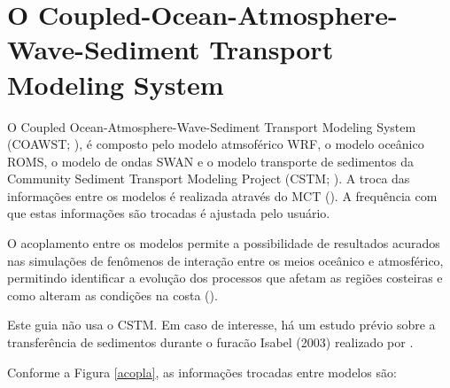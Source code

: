 \bigskip

\section{O Coupled-Ocean-Atmosphere-Wave-Sediment Transport Modeling System}
\bigskip
\noindent O Coupled Ocean-Atmosphere-Wave-Sediment Transport Modeling System (COAWST; \cite{Warner2010,Warner2008}), é composto pelo modelo atmsoférico WRF, o modelo oceânico ROMS, o modelo de ondas SWAN e o modelo transporte de sedimentos da Community Sediment Transport Modeling Project (CSTM; \cite{Warner2008}). A troca das informações entre os modelos é realizada através do MCT (\cite{Warner2010,Warner2008}). A frequência com que estas informações são trocadas é ajustada pelo usuário.
\bigskip

\noindent O acoplamento entre os modelos permite a possibilidade de resultados acurados nas simulações de fenômenos de interação entre os meios oceânico e atmosférico, permitindo identificar a evolução dos processos que afetam as regiões costeiras e como alteram as condições na costa (\cite{Pullen2018, Miller2018}).
\bigskip

\begin{tcolorbox}[enhanced,
  grow to left by   = 0cm,
  grow to right by  = 0cm,
  enlarge top by    = 0cm,
  enlarge bottom by = 0cm,
  tcbox raise base,
  boxrule           = 1.0pt,
  left              = 18mm,
  colframe          = red!50!black,coltext=red!25!black,colback=red!10!white,
  overlay           = {\begin{tcbclipinterior}\fill[red!75!blue!50!white] (frame.south west)
    rectangle node[text=white,font=\sffamily\bfseries\footnotesize,rotate=0] {ATENÇÃO} ([xshift=18mm]frame.north west);\end{tcbclipinterior}}]
Este guia não usa o CSTM. Em caso de interesse, há um estudo prévio sobre a transferência de sedimentos durante o furacão Isabel (2003) realizado por \textcite{Warner2010}.
\end{tcolorbox}
\bigskip


\noindent Conforme a Figura \textcolor{bleu_cite}{\ref{acopla}}, as informações trocadas entre modelos são:
\bigskip

